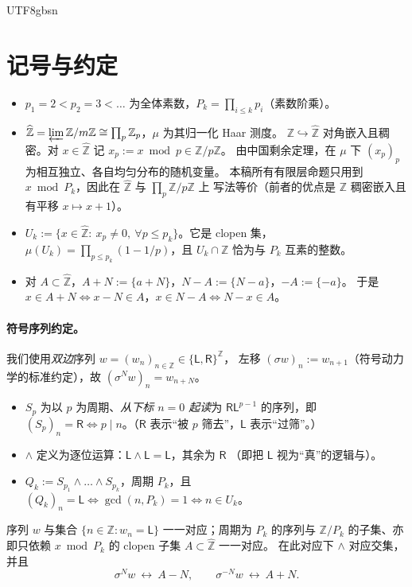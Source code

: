 \documentclass[11pt,a4paper]{article}
\newcommand{\Zhat}{\widehat{\mathbb Z}}
\newcommand{\Haar}{\mu}
\newcommand{\Lsym}{\ensuremath{\mathsf{L}}}
\newcommand{\Rsym}{\ensuremath{\mathsf{R}}}
\theoremstyle{plain}
\theoremstyle{definition}
\begin{document}
\begin{CJK}{UTF8}{gbsn}
\section{记号与约定}\label{sec:notation}

\begin{itemize}[leftmargin=*]
\item $p_1=2<p_2=3<\dots$ 为全体素数，$P_k=\prod_{i\le k}p_i$（素数阶乘）。
\item $\Zhat=\varprojlim \mathbb Z/m\mathbb Z\cong\prod_p\mathbb Z_p$，$\Haar$ 为其归一化 Haar 测度。
$\mathbb Z\hookrightarrow\Zhat$ 对角嵌入且稠密。对 $x\in\Zhat$ 记 $x_p:=x\bmod p\in\mathbb Z/p\mathbb Z$。
由中国剩余定理，在 $\Haar$ 下 $(x_p)_p$ 为相互独立、各自均匀分布的随机变量。
本稿所有有限层命题只用到 $x\bmod P_k$，因此在 $\Zhat$ 与 $\prod_p\mathbb Z/p\mathbb Z$ 上
写法等价（前者的优点是 $\mathbb Z$ 稠密嵌入且有平移 $x\mapsto x+1$）。
\item $U_k:=\{x\in\Zhat:\ x_p\neq0,\ \forall p\le p_k\}$。它是 clopen 集，
$\Haar(U_k)=\prod_{p\le p_k}(1-1/p)$，且 $U_k\cap\mathbb Z$ 恰为与 $P_k$ 互素的整数。
\item 对 $A\subset\Zhat$，$A+N:=\{a+N\}$，$N-A:=\{N-a\}$，$-A:=\{-a\}$。
于是 $x\in A+N\iff x-N\in A$，$x\in N-A\iff N-x\in A$。
\end{itemize}

\paragraph{符号序列约定。}
我们使用\emph{双边}序列 $w=(w_n)_{n\in\mathbb Z}\in\{\Lsym,\Rsym\}^{\mathbb Z}$，
左移 $(\sigma w)_n:=w_{n+1}$（符号动力学的标准约定），故 $(\sigma^N w)_n=w_{n+N}$。
\begin{itemize}[leftmargin=*]
\item $S_p$ 为以 $p$ 为周期、\emph{从下标 $n=0$ 起读}为 $\Rsym\Lsym^{p-1}$ 的序列，即
$(S_p)_n=\Rsym\iff p\mid n$。（$\Rsym$ 表示“被 $p$ 筛去”，$\Lsym$ 表示“过筛”。）
\item $\wedge$ 定义为逐位运算：$\Lsym\wedge\Lsym=\Lsym$，其余为 $\Rsym$
（即把 $\Lsym$ 视为“真”的逻辑与）。
\item $Q_k:=S_{p_1}\wedge\dots\wedge S_{p_k}$，周期 $P_k$，且
$(Q_k)_n=\Lsym\iff \gcd(n,P_k)=1\iff n\in U_k$。
\end{itemize}
序列 $w$ 与集合 $\{n\in\mathbb Z: w_n=\Lsym\}$ 一一对应；周期为 $P_k$ 的序列与
$\mathbb Z/P_k$ 的子集、亦即只依赖 $x\bmod P_k$ 的 clopen 子集 $A\subset\Zhat$ 一一对应。
在此对应下 $\wedge$ 对应交集，并且
\begin{equation}\label{eq:shiftset}
\sigma^{N}w \ \longleftrightarrow\ A-N,\qquad \sigma^{-N}w\ \longleftrightarrow\ A+N .
\end{equation}


\end{CJK}
\end{document}
